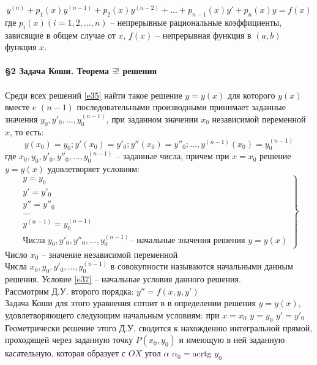 \documentclass{article}
\numberwithin{equation}{section}
\begin{document}
\begin{equation}\label{e36}
y^{(n)}+p_1(x)y^{(n-1)}+p_2(x)y^{(n-2)}+...+p_{n-1}(x)y'+p_n(x)y=f(x)
\end{equation}
где $p_i(x)(i=1,2,...,n)$ -- непрерывные рациональные коэффициенты, зависящие в общем случае от $x$, $f(x)$ -- непрерывная функция в $(a,b)$ функция $x$.
\\\\
\textbf{\large{\S2 Задача Коши. Теорема $\exists!$ решения}}
\\\\
Среди всех решений \eqref{e35} найти такое решение $y=y(x)$ для которого $y(x)$ вместе c $(n-1)$ последовательными производными принимает заданные значения $y_0,y'_0,...,y_0^{(n-1)}$, при заданном значении $x_0$ независимой переменной $x$, то есть:
\begin{equation}\label{e37}
y(x_0)=y_0;y'(x_0)=y'_0;y''(x_0)=y''_0;...,y^{(n-1)}(x_0)=y_0^{(n-1)}
\end{equation}
где $x_0,y_0,y'_0,y''_0,...,y_0^{(n-1)}$ -- заданные числа, причем при $x=x_0$ решение $y=y(x)$ удовлетворяет условиям:
\begin{equation}\label{e38}
\left.
\begin{array}{l}
y=y_0\\
y'=y'_0\\
y''=y''_0\\
...\\
y^{(n-1)}=y_0^{(n-1)}\\
\mbox{Числа }y_0,y'_0,y''_0,...,y_0^{(n-1)}\mbox{-- начальные значения решения }y=y(x)
\end{array}
\right\}
\end{equation}
Число $x_0$ -- значение независимой переменной\\
Числа $x_0,y_0,y'_0,...,y_0^{(n-1)}$ в совокупности называются начальными данным решения. Условие \eqref{e37} -- начальные условия данного решения.\\
Рассмотрим Д.У. второго порядка: $y''=f(x,y,y')$\\
Задача Коши для этого уравнения сотоит в в определении решения $y=y(x)$, удовлетворяющего следующим начальным условиям: при $x=x_0$ $y=y_0$ $y'=y'_0$\\
Геометрически решение этого Д.У. сводится к нахождению интегральной прямой, проходящей через заданную точку $P(x_0,y_0)$ и имеющую в ней заданную касательную, которая образует с $OX$ угол $\alpha$ $\alpha_0=$acrtg $y_0$
\end{document}
